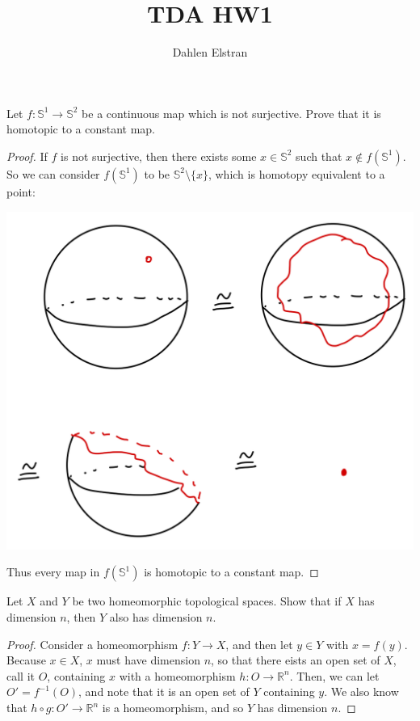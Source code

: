 \documentclass[12pt]{article}
\newcommand{\Sp}{\mathbb{S}}
\newenvironment{statement}[2][Statement]{\begin{trivlist}
\item[\hskip \labelsep {\bfseries #1}\hskip \labelsep {\bfseries #2.}]}{\end{trivlist}}
\begin{document}
 
\title{TDA HW1} 
\author{Dahlen Elstran} 
\maketitle

\begin{statement}[Problem]{1}
  Let $f: \Sp^1 \rightarrow \Sp^2$ be a continuous map which is not surjective. Prove that it is homotopic to a constant map.
\end{statement}
\begin{proof}
  If $f$ is not surjective, then there exists some $x \in \Sp^2$ such that $x \notin f(\Sp^1)$. So we can consider 
  $f(\Sp^1)$ to be $\Sp^2 \setminus \{x\}$, which is homotopy equivalent to a point:
  \par \begin{center} \includegraphics[scale=.2]{1-1.png} \end{center}
  Thus every map in $f(\Sp^1)$ is homotopic to a constant map. 
\end{proof}

\begin{statement}[Problem]{2}
  Let $X$ and $Y$ be two homeomorphic topological spaces. Show that if $X$ has dimension $n$, then $Y$ also has dimension $n$.
\end{statement}
\begin{proof}
   Consider a homeomorphism $f: Y \to X$, and then let $y \in Y$ with $x = f(y)$. Because $x \in X$, $x$ must have dimension 
   $n$, so that there eists an open set of $X$, call it $O$, containing $x$ with a homeomorphism $h: O \to \mathbb{R}^n$. 
   Then, we can let $O'=f^{-1}(O)$, and note that it is an open set of $Y$ containing $y$. We also know that 
   $h \circ g: O' \to \mathbb{R}^n$ is a homeomorphism, and so $Y$ has dimension $n$.
\end{proof}
\end{document}
